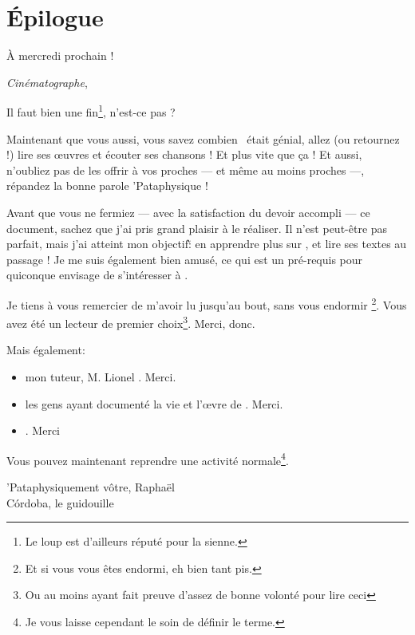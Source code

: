 \backmatter
\chapter{Épilogue}
\epigraph{À mercredi prochain !}
{\emph{Cinématographe}, \BV}
\vfill
\pagebreak

Il faut bien une fin\footnote{Le loup est d'ailleurs réputé pour la sienne.},
n'est-ce pas ?

Maintenant que vous aussi, vous
savez combien \BV\ était génial, allez (ou retournez !) lire ses
\oe{}uvres et écouter ses chansons ! Et plus vite que ça !
Et aussi, n'oubliez pas de les offrir à vos proches --- et même
au moins proches ---, répandez la bonne parole 'Pataphysique !


Avant que vous ne fermiez --- avec la satisfaction du devoir accompli --- ce document,
sachez que j'ai pris grand plaisir à le réaliser. Il n'est peut-être pas parfait,
mais j'ai atteint mon objectif\~: en apprendre plus sur \BV, et lire ses textes
au passage ! Je me suis également bien amusé, ce qui est un pré-requis pour
quiconque envisage de s'intéresser à \BV.

Je tiens à vous remercier de m'avoir lu jusqu'au bout, sans vous endormir
\footnote{Et si vous vous êtes endormi, eh bien tant pis.}. Vous avez été
un lecteur de premier choix\footnote{Ou au moins ayant fait preuve d'assez de
bonne volonté pour lire ceci}. Merci, donc.

Mais également:
\begin{itemize}
\item mon tuteur, M. Lionel . Merci.
\item les gens ayant documenté la vie et l'\oe{}vre de \BV. Merci.
\item \BV. Merci
\end{itemize}

Vous pouvez maintenant reprendre une activité normale\footnote{Je vous laisse
cependant le soin de définir le terme.}.

\vfill
\hfill 'Pataphysiquement vôtre,
\vskip 2cm
\hfill Raphaël\\
\hfill Córdoba, le  guidouille 
\vskip 2cm

\tableofcontents

